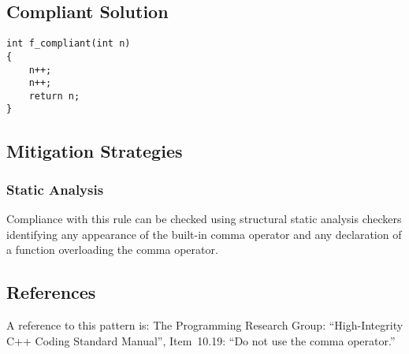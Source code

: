 \subsection{Compliant Solution}

\begin{verbatim}
int f_compliant(int n)
{
    n++;
    n++;
    return n;
}
\end{verbatim}

\subsection{Mitigation Strategies}
\subsubsection{Static Analysis} 

Compliance with this rule can be checked using structural static analysis
checkers identifying any appearance of the built-in comma operator and any
declaration of a function overloading the comma operator.

\subsection{References}

A reference to this pattern is: The Programming Research Group:
``High-Integrity C++ Coding Standard Manual'', Item~10.19: ``Do not use the
comma operator.''
